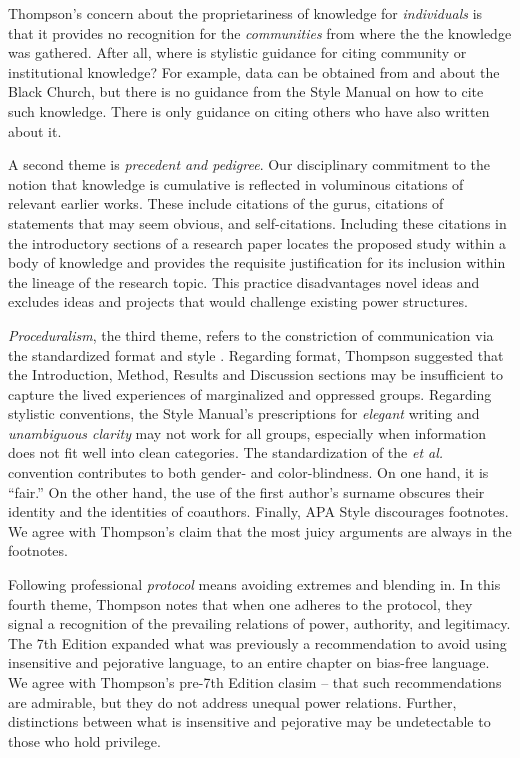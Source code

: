 \documentclass[
  11pt,
]{book}
\begin{document}
Thompson's \citeyearpar{thompson_gentlemanly_2004} concern about the proprietariness of knowledge for \emph{individuals} is that it provides no recognition for the \emph{communities} from where the the knowledge was gathered. After all, where is stylistic guidance for citing community or institutional knowledge? For example, data can be obtained from and about the Black Church, but there is no guidance from the Style Manual on how to cite such knowledge. There is only guidance on citing others who have also written about it.

A second theme is \emph{precedent and pedigree}. Our disciplinary commitment to the notion that knowledge is cumulative is reflected in voluminous citations of relevant earlier works. These include citations of the gurus, citations of statements that may seem obvious, and self-citations. Including these citations in the introductory sections of a research paper locates the proposed study within a body of knowledge and provides the requisite justification for its inclusion within the lineage of the research topic. This practice disadvantages novel ideas and excludes ideas and projects that would challenge existing power structures.

\emph{Proceduralism}, the third theme, refers to the constriction of communication via the standardized format and style \citep{thompson_gentlemanly_2004}. Regarding format, Thompson suggested that the Introduction, Method, Results and Discussion sections may be insufficient to capture the lived experiences of marginalized and oppressed groups. Regarding stylistic conventions, the Style Manual's prescriptions for \emph{elegant} writing and \emph{unambiguous clarity} may not work for all groups, especially when information does not fit well into clean categories. The standardization of the \emph{et al.} convention contributes to both gender- and color-blindness. On one hand, it is ``fair.'' On the other hand, the use of the first author's surname obscures their identity and the identities of coauthors. Finally, APA Style discourages footnotes. We agree with Thompson's claim that the most juicy arguments are always in the footnotes.

Following professional \emph{protocol} means avoiding extremes and blending in. In this fourth theme, Thompson \citeyearpar{thompson_gentlemanly_2004} notes that when one adheres to the protocol, they signal a recognition of the prevailing relations of power, authority, and legitimacy. The 7th Edition expanded what was previously a recommendation to avoid using insensitive and pejorative language, to an entire chapter on bias-free language. We agree with Thompson's pre-7th Edition clasim -- that such recommendations are admirable, but they do not address unequal power relations. Further, distinctions between what is insensitive and pejorative may be undetectable to those who hold privilege.
\end{document}
